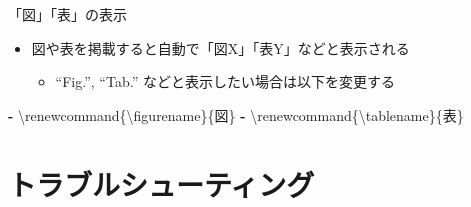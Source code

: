 \documentclass[
  12pt,
  ignorenonframetext,
]{beamer}
\newenvironment{Shaded}{\begin{snugshade}}{\end{snugshade}}
\newcommand{\AttributeTok}[1]{\textcolor[rgb]{0.77,0.63,0.00}{#1}}
\newcommand{\KeywordTok}[1]{\textcolor[rgb]{0.13,0.29,0.53}{\textbf{#1}}}
\providecommand{\tightlist}{%
  \setlength{\itemsep}{0pt}\setlength{\parskip}{0pt}}
\begin{document}
\begin{frame}[fragile]{「図」「表」の表示}
\protect\hypertarget{ux56f3ux8868ux306eux8868ux793a}{}

\begin{itemize}
\tightlist
\item
  図や表を掲載すると自動で「図X」「表Y」などと表示される

  \begin{itemize}
  \tightlist
  \item
    ``Fig.'', ``Tab.'' などと表示したい場合は以下を変更する
  \end{itemize}
\end{itemize}

\begin{Shaded}
\begin{Highlighting}[]
\KeywordTok{-}\AttributeTok{ \textbackslash{}renewcommand\{\textbackslash{}figurename\}\{図\}}
\KeywordTok{-}\AttributeTok{ \textbackslash{}renewcommand\{\textbackslash{}tablename\}\{表\}}
\end{Highlighting}
\end{Shaded}

\end{frame}

\hypertarget{ux30c8ux30e9ux30d6ux30ebux30b7ux30e5ux30fcux30c6ux30a3ux30f3ux30b0}{%
\section{トラブルシューティング}\label{ux30c8ux30e9ux30d6ux30ebux30b7ux30e5ux30fcux30c6ux30a3ux30f3ux30b0}}
\end{document}
